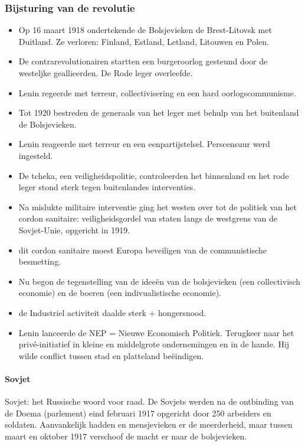 \documentclass{article}
\begin{document}
\subsubsection{Bijsturing van de revolutie}
\begin{itemize}
    \item Op 16 maart 1918 ondertekende de Bolsjevieken de Brest-Litovsk met Duitland. Ze verloren: Finland, Estland, Letland, Litouwen en Polen.
    \item De contrarevolutionairen startten een burgeroorlog gesteund door de westeljke geallieerden. De Rode leger overleefde.
    \item Lenin regeerde met terreur, collectivisering en een hard oorlogscommunisme.
    \item Tot 1920 bestreden de generaals van het leger met behulp van het buitenland de Bolsjevieken.
    \item Lenin reageerde met terreur en een eenpartijstelsel. Perscensuur werd ingesteld.
    \item De tcheka, een veiligheidspolitie, controleerden het binnenland en het rode leger stond sterk tegen buitenlandes interventies.
    \item Na mislukte militaire interventie ging het westen over tot de politiek van het cordon sanitaire: veiligheidsgordel van staten langs de westgrens van de Sovjet-Unie, opgericht in 1919.
    \item dit cordon sanitaire moest Europa beveiligen van de communistische besmetting.
    \item Nu begon de tegenstelling van de ideeën van de bolsjevieken (een collectivisch economie) en de boeren (een indivualistische economie).
    \item de Industriel activiteit daalde sterk + hongersnood.
    \item Lenin lanceerde de NEP = Nieuwe Economisch Politiek. Terugkeer naar het privé-initiatief in kleine en middelgrote ondernemingen en in de hande. Hij wilde conflict tussen stad en platteland beëindigen.
\end{itemize}
\paragraph{Sovjet}
Sovjet: het Russische woord voor raad. De Sovjets werden na de ontbinding van de Doema (parlement) eind februari 1917 opgericht door 250 arbeiders en soldaten. Aanvankelijk hadden en mensjevieken er de meerderheid, maar tussen maart en oktober 1917 verschoof de macht er naar de bolsjevieken.
\end{document}
